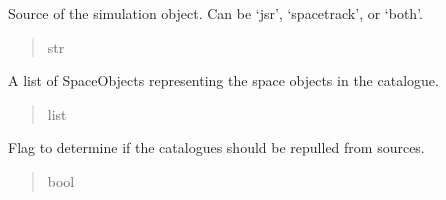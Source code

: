\documentclass[letterpaper,10pt,english]{sphinxmanual}
\begin{document}
\begin{fulllineitems}
\begin{fulllineitems}
\end{fulllineitems}


\begin{fulllineitems}
\label{\detokenize{fspsim.utils:fspsim.utils.SpaceCatalogue.SpaceCatalogue.sim_object_catalogue}}
\pysigstartsignatures
{}
\pysigstopsignatures
\sphinxAtStartPar
Source of the simulation object. Can be ‘jsr’, ‘spacetrack’, or ‘both’.
\begin{quote}\begin{description}
\sphinxAtStartPar
str

\end{description}\end{quote}

\end{fulllineitems}


\begin{fulllineitems}
\label{\detokenize{fspsim.utils:fspsim.utils.SpaceCatalogue.SpaceCatalogue.Catalogue}}
\pysigstartsignatures
{}
\pysigstopsignatures
\sphinxAtStartPar
A list of SpaceObjects representing the space objects in the catalogue.
\begin{quote}\begin{description}
\sphinxAtStartPar
list

\end{description}\end{quote}

\end{fulllineitems}


\begin{fulllineitems}
\label{\detokenize{fspsim.utils:fspsim.utils.SpaceCatalogue.SpaceCatalogue.repull_catalogues}}
\pysigstartsignatures
{}
\pysigstopsignatures
\sphinxAtStartPar
Flag to determine if the catalogues should be repulled from sources.
\begin{quote}\begin{description}
\sphinxAtStartPar
bool


\end{description}
\end{quote}
\end{fulllineitems}
\end{fulllineitems}
\end{document}
